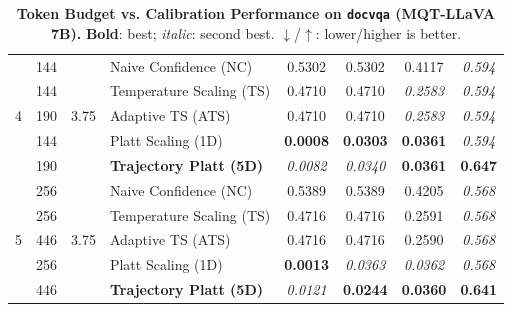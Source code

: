 \begin{table}[t]
\begin{tabular}{ccclcccc}
\midrule
\multirow{5}{*}{4} & 144 & \multirow{5}{*}{3.75} & Naive Confidence (NC) & 0.5302 & 0.5302 & 0.4117 & \textit{0.594} \\
 & 144 &  & Temperature Scaling (TS) & 0.4710 & 0.4710 & \textit{0.2583} & \textit{0.594} \\
 & 190 &  & Adaptive TS (ATS) & 0.4710 & 0.4710 & \textit{0.2583} & \textit{0.594} \\
 & 144 &  & Platt Scaling (1D) & \textbf{0.0008} & \textbf{0.0303} & \textbf{0.0361} & \textit{0.594} \\
 & 190 &  & \textbf{Trajectory Platt (5D)} & \textit{0.0082} & \textit{0.0340} & \textbf{0.0361} & \textbf{0.647} \\
\midrule
\multirow{5}{*}{5} & 256 & \multirow{5}{*}{3.75} & Naive Confidence (NC) & 0.5389 & 0.5389 & 0.4205 & \textit{0.568} \\
 & 256 &  & Temperature Scaling (TS) & 0.4716 & 0.4716 & 0.2591 & \textit{0.568} \\
 & 446 &  & Adaptive TS (ATS) & 0.4716 & 0.4716 & 0.2590 & \textit{0.568} \\
 & 256 &  & Platt Scaling (1D) & \textbf{0.0013} & \textit{0.0363} & \textit{0.0362} & \textit{0.568} \\
 & 446 &  & \textbf{Trajectory Platt (5D)} & \textit{0.0121} & \textbf{0.0244} & \textbf{0.0360} & \textbf{0.641} \\
\bottomrule
\end{tabular}
\caption{\textbf{Token Budget vs. Calibration Performance on \texttt{docvqa} (MQT-LLaVA 7B).} \textbf{Bold}: best; \textit{italic}: second best. $\downarrow$/$\uparrow$: lower/higher is better.}
\label{tab:token_budget_docvqa_mqt}
\end{table}
